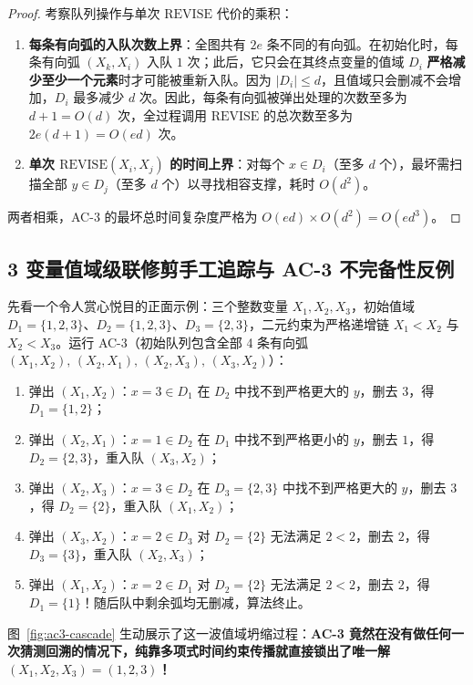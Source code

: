 \begin{proof}
考察队列操作与单次 $\mathrm{REVISE}$ 代价的乘积：
\begin{enumerate}
  \item \textbf{每条有向弧的入队次数上界}：全图共有 $2e$ 条不同的有向弧。在初始化时，每条有向弧 $(X_k, X_i)$ 入队 $1$ 次；此后，它只会在其终点变量的值域 $D_i$ \textbf{严格减少至少一个元素}时才可能被重新入队。因为 $|D_i| \le d$，且值域只会删减不会增加，$D_i$ 最多减少 $d$ 次。因此，每条有向弧被弹出处理的次数至多为 $d + 1 = O(d)$ 次，全过程调用 $\mathrm{REVISE}$ 的总次数至多为 $2e(d+1) = O(ed)$ 次。
  \item \textbf{单次 $\mathrm{REVISE}(X_i, X_j)$ 的时间上界}：对每个 $x \in D_i$（至多 $d$ 个），最坏需扫描全部 $y \in D_j$（至多 $d$ 个）以寻找相容支撑，耗时 $O(d^2)$。
\end{enumerate}
两者相乘，AC-3 的最坏总时间复杂度严格为 $O(ed) \times O(d^2) = O(ed^3)$。
\end{proof}

\subsection{3 变量值域级联修剪手工追踪与 AC-3 不完备性反例}

先看一个令人赏心悦目的正面示例：三个整数变量 $X_1, X_2, X_3$，初始值域 $D_1 = \{1,2,3\}$、$D_2 = \{1,2,3\}$、$D_3 = \{2,3\}$，二元约束为严格递增链 $X_1 < X_2$ 与 $X_2 < X_3$。运行 AC-3（初始队列包含全部 4 条有向弧 $(X_1,X_2),\allowbreak\,(X_2,X_1),\allowbreak\,(X_2,X_3),\allowbreak\,(X_3,X_2)$）：
\begin{enumerate}
  \item 弹出 $(X_1, X_2)$：$x=3\in D_1$ 在 $D_2$ 中找不到严格更大的 $y$，删去 $3$，得 $D_1=\{1,2\}$；
  \item 弹出 $(X_2, X_1)$：$x=1\in D_2$ 在 $D_1$ 中找不到严格更小的 $y$，删去 $1$，得 $D_2=\{2,3\}$，重入队 $(X_3, X_2)$；
  \item 弹出 $(X_2, X_3)$：$x=3\in D_2$ 在 $D_3=\{2,3\}$ 中找不到严格更大的 $y$，删去 $3$，得 $D_2=\{2\}$，重入队 $(X_1, X_2)$；
  \item 弹出 $(X_3, X_2)$：$x=2\in D_3$ 对 $D_2=\{2\}$ 无法满足 $2<2$，删去 $2$，得 $D_3=\{3\}$，重入队 $(X_2, X_3)$；
  \item 弹出 $(X_1, X_2)$：$x=2\in D_1$ 对 $D_2=\{2\}$ 无法满足 $2<2$，删去 $2$，得 $D_1=\{1\}$！随后队中剩余弧均无删减，算法终止。
\end{enumerate}
图~\ref{fig:ac3-cascade} 生动展示了这一波值域坍缩过程：\textbf{AC-3 竟然在没有做任何一次猜测回溯的情况下，纯靠多项式时间约束传播就直接锁出了唯一解 $(X_1,X_2,X_3)=(1,2,3)$！}


